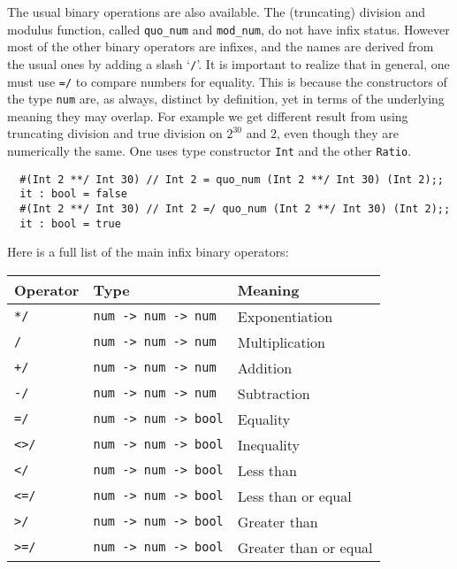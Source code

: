 The usual binary operations are also available. The (truncating) division and
modulus function, called {\tt quo\_num} and {\tt mod\_num}, do not have infix
status. However most of the other binary operators are infixes, and the names
are derived from the usual ones by adding a slash `{\verb!/!}'. It is important
to realize that in general, one must use {\tt =/} to compare numbers for
equality. This is because the constructors of the type {\tt num} are, as
always, distinct by definition, yet in terms of the underlying meaning they may
overlap. For example we get different result from using truncating division and
true division on $2^{30}$ and $2$, even though they are numerically the same.
One uses type constructor {\tt Int} and the other {\tt Ratio}.

\begin{boxed}\begin{verbatim}
  #(Int 2 **/ Int 30) // Int 2 = quo_num (Int 2 **/ Int 30) (Int 2);;
  it : bool = false
  #(Int 2 **/ Int 30) // Int 2 =/ quo_num (Int 2 **/ Int 30) (Int 2);;
  it : bool = true
\end{verbatim}\end{boxed}

\noindent Here is a full list of the main infix binary operators:

\bigskip
\begin{tabular}{|l|l|l|}
\hline
Operator   & Type                             & Meaning               \\
\hline
{\tt **/}  & {\tt num -> num -> num}          & Exponentiation        \\
{\tt */}   & {\tt num -> num -> num}          & Multiplication        \\
{\tt +/}   & {\tt num -> num -> num}          & Addition              \\
{\tt -/}   & {\tt num -> num -> num}          & Subtraction           \\
{\tt =/}   & {\tt num -> num -> bool}         & Equality              \\
{\tt <>/}  & {\tt num -> num -> bool}         & Inequality            \\
{\tt </}   & {\tt num -> num -> bool}         & Less than             \\
{\tt <=/}  & {\tt num -> num -> bool}         & Less than or equal    \\
{\tt >/}   & {\tt num -> num -> bool}         & Greater than          \\
{\tt >=/}  & {\tt num -> num -> bool}         & Greater than or equal \\
\hline
\end{tabular}
\bigskip

